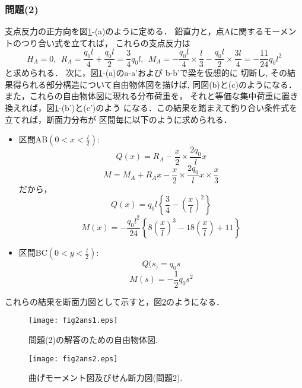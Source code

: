 \documentclass[10pt,a4j]{jarticle}
\begin{document}
\subsubsection*{問題(2)}
支点反力の正方向を図\ref{fig:fig2_1}-(a)のように定める．
鉛直力と，点Aに関するモーメントのつり合い式を立てれば，
これらの支点反力は
\begin{equation}
	H_A=0, \ \
	R_A=\frac{q_0l}{4}+\frac{q_0l}{2}=\frac{3}{4}q_0l, \ \ 
	M_A=- \frac{q_0l}{4}\times \frac{l}{3} -\frac{q_0l}{2}\times \frac{3l}{4} =-\frac{11}{24}q_0l^2
\end{equation}
と求められる．
次に，図\ref{fig:fig2_1}-(a)のa-a'および b-b'で梁を仮想的に
切断し, その結果得られる部分構造について自由物体図を描けば, 
同図(b)と(c)のようになる．また，これらの自由物体図に現れる分布荷重を，
それと等価な集中荷重に置き換えれば，図\ref{fig:fig2_1}-(b')と(c')のよう
になる．この結果を踏まえて釣り合い条件式を立てれば，断面力分布が
区間毎に以下のように求められる．
\begin{itemize}
\item
	区間AB$\left( 0<x<\frac{l}{2}\right)$:\\
	\begin{equation}
		Q(x)=R_A-\frac{x}{2}\times \frac{2q_0}{l}x 
	\end{equation}
	\begin{equation}
		M=M_A+R_Ax-
		\frac{x}{2}\times
		\frac{2q_0}{l}x \times\frac{x}{3}
	\end{equation}
	だから，
	\begin{equation}
		Q(x) =
		q_0l \left\{ 
			\frac{3}{4} -\left( \frac{x}{l} \right)^2
		\right\}
	\end{equation}
	\begin{equation}
		M(x) =
		-\frac{q_0l^2}{24} \left\{ 
			8\left( \frac{x}{l} \right)^3
			-18 \left(\frac{x}{l}\right) 
			+11
		\right\}
	\end{equation}
\item
	区間BC$\left( 0<y<\frac{l}{2}\right)$:\\
	\begin{equation}
		Q(s_)=q_0s
	\end{equation}
	\begin{equation}
		M(s)=-\frac{1}{2}q_0s^2 
	\end{equation}
\end{itemize}
これらの結果を断面力図として示すと，図\ref{fig:fig2_2}のようになる．
\begin{figure}[h]
	\begin{center}
	\texttt{[image: fig2ans1.eps]} 
	\end{center}
	\caption{問題(2)の解答のための自由物体図.} 
	\label{fig:fig2_1}
\end{figure}
\begin{figure}[h]
	\begin{center}
	\texttt{[image: fig2ans2.eps]} 
	\end{center}
	\caption{曲げモーメント図及びせん断力図(問題2).} 
	\label{fig:fig2_2}
\end{figure}
\end{document}
